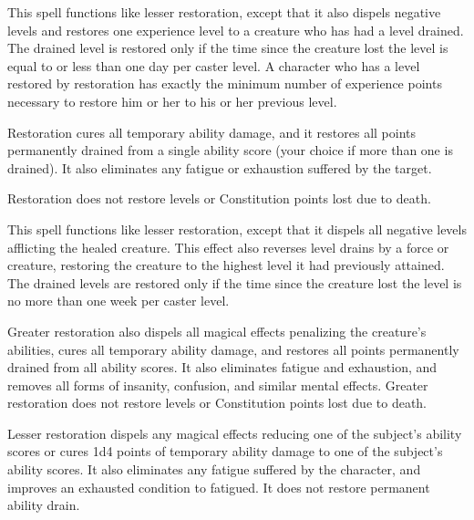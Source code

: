 \begin{multicols}{2}
\begin{small}
\noindent This spell functions like lesser restoration, except that it also dispels negative levels and restores one experience level to a creature who has had a level drained. The drained level is restored only if the time since the creature lost the level is equal to or less than one day per caster level. A character who has a level restored by restoration has exactly the minimum number of experience points necessary to restore him or her to his or her previous level.

\smallskip\noindent Restoration cures all temporary ability damage, and it restores all points permanently drained from a single ability score (your choice if more than one is drained). It also eliminates any fatigue or exhaustion suffered by the target. 

\smallskip\noindent Restoration does not restore levels or Constitution points lost due to death.


\noindent This spell functions like lesser restoration, except that it dispels all negative levels afflicting the healed creature. This effect also reverses level drains by a force or creature, restoring the creature to the highest level it had previously attained. The drained levels are restored only if the time since the creature lost the level is no more than one week per caster level.

\smallskip\noindent Greater restoration also dispels all magical effects penalizing the creature's abilities, cures all temporary ability damage, and restores all points permanently drained from all ability scores. It also eliminates fatigue and exhaustion, and removes all forms of insanity, confusion, and similar mental effects. Greater restoration does not restore levels or Constitution points lost due to death.


\smallskip\noindent Lesser restoration dispels any magical effects reducing one of the subject's ability scores or cures 1d4 points of temporary ability damage to one of the subject's ability scores. It also eliminates any fatigue suffered by the character, and improves an exhausted condition to fatigued. It does not restore permanent ability drain.


\end{small}
\end{multicols}
